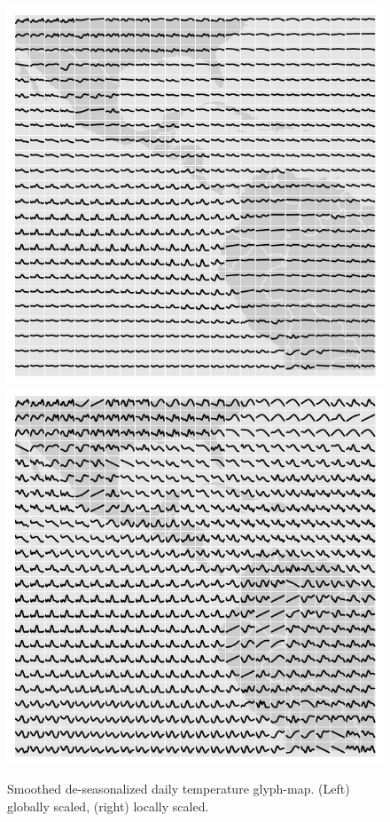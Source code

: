 \documentclass[oneside]{article}
\begin{document}

\begin{figure}[htbp]
  \centering
  \includegraphics[width=0.5\linewidth]{month-rescale-max}%
  \includegraphics[width=0.5\linewidth]{month-rescale01}
  \caption{Smoothed de-seasonalized daily temperature glyph-map. (Left) %
globally scaled, (right) locally scaled.}
  \label{fig:scaling}
\end{figure}


\end{document}
